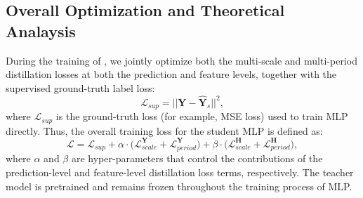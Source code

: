 \subsection{Overall Optimization and Theoretical Analaysis}
During the training of \method{}, we jointly optimize both the multi-scale and multi-period distillation losses at both the prediction and feature levels, together with the supervised ground-truth label loss:
\begin{equation}
    \mathcal{L}_{sup} = ||\mathbf{Y} - \mathbf{\hat{Y}}_s||^2,
\end{equation}
where \(\mathcal{L}_{sup}\) is the ground-truth loss (for example, MSE loss) used to train MLP directly. Thus, the overall training loss for the student MLP is defined as:
\begin{equation}
    \mathcal{L} = \mathcal{L}_{sup} + \alpha \cdot \bigl(\mathcal{L}_{scale}^\mathbf{Y} + \mathcal{L}_{period}^\mathbf{Y}\bigr) + \beta \cdot \bigl(\mathcal{L}_{scale}^\mathbf{H} + \mathcal{L}_{period}^\mathbf{H}\bigr),
    \label{eq:overall_optimization}
\end{equation}
where \(\alpha\) and \(\beta\) are hyper-parameters that control the contributions of the prediction-level and feature-level distillation loss terms, respectively. The teacher model is pretrained and remains frozen throughout the training process of MLP.


